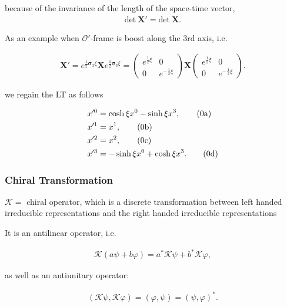 \documentclass[12pt]{beamer}
\newcommand{\stag}[1]{\tag{\arabic{equation}#1}}
\newcommand{\Kappa}[0]{\bm{\mathcal{K}}}
\begin{document}
\begin{frame}
\noindent because of the invariance of the length of the space-time vector,\\[-10pt]

\begin{align}
\mbox{det}~\bm{X}'=\mbox{det}~\bm{X}.
\end{align}

As an example when $ \mathcal{O}' $-frame is boost along the 3rd axis, i.e.

\begin{align}
\bm{X}'=e^{\frac{1}{2}\bm{\sigma}_3\xi}\bm{X}e^{\frac{1}{2}\bm{\sigma}_3\xi}=
\begin{pmatrix}e^{\frac{1}{2}\xi}&0\\0&e^{-\frac{1}{2}\xi}\end{pmatrix}\bm{X}
\begin{pmatrix}e^{\frac{1}{2}\xi}&0\\0&e^{-\frac{1}{2}\xi}\end{pmatrix}.
\end{align}

\noindent we regain the LT as follows

\addtocounter{equation}{1}
\begin{align*}
x'^0&=\cosh\xi x^0-\sinh\xi x^3,\stag{a}\\
x'^1&=x^1,\stag{b}\\
x'^2&=x^2,\stag{c}\\
x'^3&=-\sinh\xi x^0+\cosh\xi x^3.\stag{d}
\end{align*}

\end{frame}
\begin{frame}
\frametitle{Chiral Transformation}
$ \Kappa =$ chiral operator, which is a discrete transformation between left handed irreducible representations and the right handed irreducible representations

It is an antilinear operator, i.e.
 
\begin{align}
\Kappa(a\psi+b\varphi)=a^*\Kappa\psi+b^*\Kappa\varphi,
\end{align}

\noindent as well as an antiunitary operator:

\begin{align}
(\Kappa\psi,\Kappa\varphi)=(\varphi,\psi)=(\psi,\varphi)^*.
\end{align} 
\end{frame}
\end{document}
